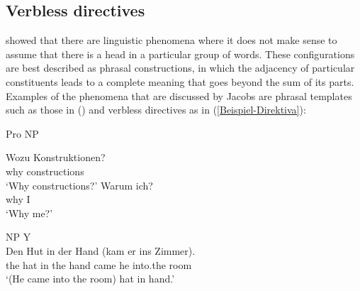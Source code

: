 \begin{exe}
\begin{xlist}[iv.]
\begin{exe}
\begin{xlist}[iv.]
\subsection{Verbless directives}
\label{Abschnitt-Phrasale-Konstruktionen-Jacobs}

\citet{Jacobs2008a} showed that there are linguistic phenomena where it does not make sense to assume that there is a head
in a particular group of words. These configurations are best described as phrasal constructions, in which the adjacency of particular
constituents leads to a complete meaning that goes beyond the sum of its parts. Examples of the
phenomena that are discussed by Jacobs are phrasal templates such as those in ()
and verbless directives as in (\ref{Beispiel-Direktiva}):
\begin{exe}
\ex Pro NP
\begin{xlist}
\ex
\gll  Wozu Konstruktionen?\\
      why constructions\\
\glt `Why constructions?'
\ex 
\gll Warum ich?\\
     why I\\
\glt `Why me?'
\end{xlist}
\end{exe}
\ea
NP Y\\
\gll Den Hut in der Hand (kam er ins Zimmer).\\
     the hat in the hand came he into.the room\\
\glt `(He came into the room) hat in hand.'


\end{xlist}
\end{exe}
\end{xlist}
\end{exe}

